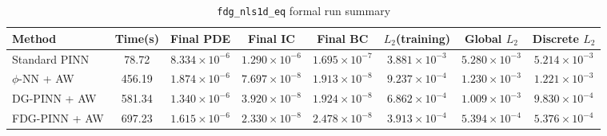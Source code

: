 \begin{table}[h]
\centering
\caption{\texttt{fdg\_nls1d\_eq} formal run summary}
\begin{adjustbox}{max width=\textwidth}
\scriptsize
\begin{tabular}{lccccccc}
\toprule
Method & Time(s) & Final PDE & Final IC & Final BC & $L_2$(training) & Global $L_2$ & Discrete $L_2$ \\
\midrule
Standard PINN & 78.72 & $8.334\times10^{-6}$ & $1.290\times10^{-6}$ & $1.695\times10^{-7}$ & $3.881\times10^{-3}$ & $5.280\times10^{-3}$ & $5.214\times10^{-3}$ \\
$\phi$-NN + AW & 456.19 & $1.874\times10^{-6}$ & $7.697\times10^{-8}$ & $1.913\times10^{-8}$ & $9.237\times10^{-4}$ & $1.230\times10^{-3}$ & $1.221\times10^{-3}$ \\
DG-PINN + AW & 581.34 & $1.340\times10^{-6}$ & $3.920\times10^{-8}$ & $1.924\times10^{-8}$ & $6.862\times10^{-4}$ & $1.009\times10^{-3}$ & $9.830\times10^{-4}$ \\
FDG-PINN + AW & 697.23 & $1.615\times10^{-6}$ & $2.330\times10^{-8}$ & $2.478\times10^{-8}$ & $3.913\times10^{-4}$ & $5.394\times10^{-4}$ & $5.376\times10^{-4}$ \\
\bottomrule
\end{tabular}
\end{adjustbox}
\end{table}
